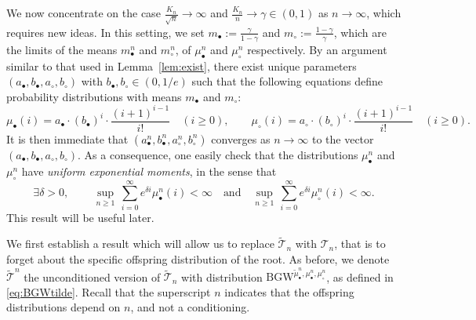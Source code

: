 \documentclass[AHL,XML,longabstracts,Unicode]{cedram}
\def\ab{a_{\bullet}}
\def\ac{a_{\circ}}
\def\bb{b_{\bullet}}
\def\bc{b_{\circ}}
\def\abn{a_{\bullet}^{n}}
\def\acn{a_{\circ}^{n}}
\def\bbn{b_{\bullet}^{n}}
\def\bcn{b_{\circ}^{n}}
\def\mub{\mu_{\bullet}}
\def\muc{\mu_{\circ}}
\def\mubn{\mu_{\bullet}^{n}}
\def\mucn{\mu_{\circ}^{n}}
\def\tTs{\tilde{\Ts}}
\newcommand\BGW{\textrm{BGW}}
\def\Ts{\mathscr{T}}
\begin{document}
We now concentrate on the case  $\tfrac{K_{n}}{\sqrt{n}} \rightarrow \infty$ and $ \tfrac{K_{n}}{n}  \rightarrow \gamma \in (0,1)$ as $n \rightarrow \infty$, which requires new ideas.
In this setting, we set $m_\bullet:=\frac{\gamma}{1-\gamma}$ and $m_\circ:=\frac{1-\gamma}{\gamma}$,
which are the limits of the means $m_\bullet^n$ and $m_\circ^n$, of $\mubn$ and $\mucn$ respectively.
By an argument similar to that used in Lemma~\ref{lem:exist}, there exist unique parameters $(\ab,\bb,\ac,\bc)$ with $\bb,\bc \in (0,1/e)$
such that the following equations define probability distributions with means $m_\bullet$ and $m_\circ$:
 \begin{equation}
 \label{eq:mubc}\mub(i)= \ab \cdot  (\bb)^{i} \cdot \frac{(i+1)^{i-1}}{i!}  \quad (i \geq 0), \qquad \muc(i)= \ac \cdot  (\bc)^{i} \cdot \frac{(i+1)^{i-1}}{i!}  \quad (i \geq 0).
 \end{equation}
 It is then immediate that $(\abn,\bbn,\acn,\bcn)$ converges as $n \rightarrow \infty$ to the vector $(\ab,\bb,\ac,\bc)$.
 As a consequence, one easily check that the distributions $\mubn$ and $\mucn$
 have {\em uniform exponential moments}, in the sense that
 \begin{equation}
   \label{eq:expmoment} \exists \delta>0,\,  \qquad  \sup_{n \ge 1} \, \sum_{i=0}^{\infty} e^{\delta i} \mubn(i) < \infty
   \quad \textrm{and} \quad \sup_{n \ge 1}\, \sum_{i=0}^{\infty} e^{\delta i} \mucn(i) < \infty.
 \end{equation}
 This result will be useful later.

We first establish a result which will allow us to replace $\tTs_{n}$ with $\Ts_{n}$,
that is to forget about the specific offspring distribution of the root.
As before, we denote $\tilde{\Ts} ^{n}$ the unconditioned version of $\tTs_n$
with distribution ${\BGW}^{\widetilde{\mu}_{\bullet}^{n},\mubn,\mucn}$, as defined in \eqref{eq:BGWtilde}.
Recall that the superscript $n$ indicates that the offspring distributions depend on $n$, and not a conditioning.
\end{document}
